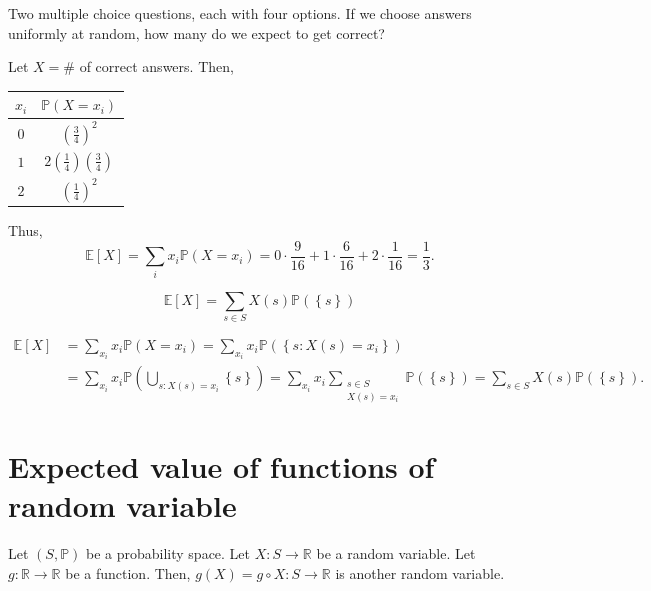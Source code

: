 \begin{eg}
    Two multiple choice questions, each with four options. If we choose answers uniformly at random, how many do we expect to get correct?
\end{eg}
\begin{explanation}
    Let \(X = \#\) of correct answers. Then, 
    \renewcommand{\arraystretch}{1.5}
    \begin{table}[H]
        \centering
        \begin{tabular}{c|c}
            \toprule
                \(x_i\)  & \(\mathbb{P} (X = x_i)\)   \\
            \midrule
                \(0\)  & \(\left( \frac{3}{4} \right)^2 \)  \\

                \(1\)  & \(2 \left( \frac{1}{4} \right) \left( \frac{3}{4} \right)  \)   \\
                \(2\)  & \(\left( \frac{1}{4} \right)^2 \)   \\
            \bottomrule
        \end{tabular}
    \end{table} 
    Thus, 
    \[
        \mathbb{E} [X] = \sum_{i} x_i \mathbb{P} (X = x_i) = 0 \cdot \frac{9}{16} + 1 \cdot \frac{6}{16} + 2 \cdot \frac{1}{16} = \frac{1}{3}. 
    \]
\end{explanation}

\begin{claim}
    \[
        \mathbb{E} [X] = \sum_{s \in S} X(s) \mathbb{P} (\left\{ s \right\} ) 
    \]
\end{claim}
\begin{explanation}
        \begin{align*}
            \mathbb{E} [X] &= \sum_{x_i} x_i \mathbb{P} (X = x_i) = \sum_{x_i} x_i \mathbb{P} (\left\{ s : X(s) = x_i \right\} ) \\
            &= \sum_{x_i} x_i \mathbb{P} \left( \bigcup_{s: X(s) = x_i} \left\{ s \right\}   \right) = \sum_{x_i} x_i \sum_{\substack{s \in S \\ X(s) = x_i}} \mathbb{P} (\left\{ s \right\} ) = \sum_{s \in S} X(s) \mathbb{P} \left( \left\{ s \right\}  \right).    
        \end{align*}
\end{explanation}

\section{Expected value of functions of random variable}
Let \((S, \mathbb{P} )\) be a probability space. Let \(X: S \to \mathbb{R} \) be a random variable. Let \(g: \mathbb{R} \to \mathbb{R} \) be a function. Then, \(g(X) = g \circ X: S \to \mathbb{R} \) is another random variable.

